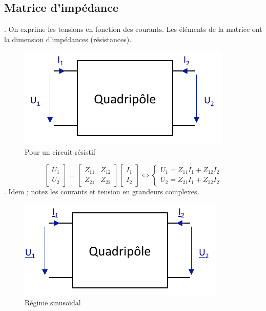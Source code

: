 \documentclass[12pt,a4paper]{article}
\begin{document}
\subsection{Matrice d'impédance}
. On exprime les tensions en fonction des courants. Les éléments de la matrice ont la dimension d'impédances (résistances).
\begin{figure}[!h]
	\centering
	\includegraphics[scale=0.6]{images/matrice_impedance_resistif}
	\caption{Pour un circuit résistif}
\end{figure}
\begin{equation}
	\begin{bmatrix}
	U_1\\
	U_2
	\end{bmatrix} = 
	\begin{bmatrix}
		Z_{11} & Z_{12}\\
		Z_{21} & Z_{22}
	\end{bmatrix} \begin{bmatrix}
	I_1\\
	I_2
	\end{bmatrix} \iff \left\{\begin{array}{l}
U_1 = Z_{11}I_1 + Z_{12}I_2\\
U_2 = Z_{21}I_1 + Z_{22}I_2
\end{array}\right.
\end{equation}
. Idem ; notez les courants et tension en grandeurs complexes.
\begin{figure}[!h]
	\centering
	\includegraphics[scale=0.6]{images/matrice_impedance_sinu}
	\caption{Régime sinusoïdal}
\end{figure}
\end{document}
